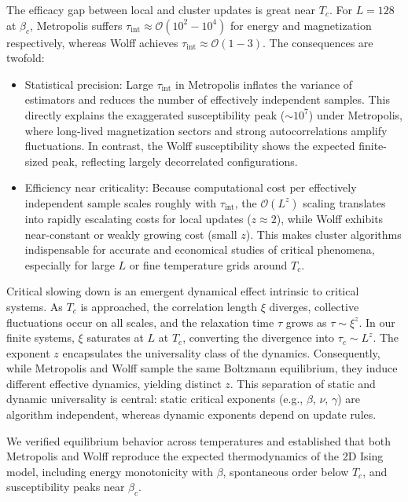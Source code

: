 The efficacy gap between local and cluster updates is great near $T_c$. For $L=128$ at $\beta_c$, Metropolis suffers $\tau_{\text{int}} \approx \mathcal{O}(10^{2}-10^{4})$ for energy and magnetization respectively, whereas Wolff achieves $\tau_{\text{int}} \approx \mathcal{O}(1-3)$. The consequences are twofold:
\begin{itemize}
	\item Statistical precision: Large $\tau_{\mathrm{int}}$ in Metropolis inflates the variance of estimators and reduces the number of effectively independent samples. This directly explains the exaggerated susceptibility peak ($\sim 10^{7}$) under Metropolis, where long-lived magnetization sectors and strong autocorrelations amplify fluctuations. In contrast, the Wolff susceptibility shows the expected finite-sized peak, reflecting largely decorrelated configurations.
	\item Efficiency near criticality: Because computational cost per effectively independent sample scales roughly with $\tau_{\mathrm{int}}$, the $\mathcal{O}(L^{z})$ scaling translates into rapidly escalating costs for local updates ($z \approx 2$), while Wolff exhibits near-constant or weakly growing cost (small $z$). This makes cluster algorithms indispensable for accurate and economical studies of critical phenomena, especially for large $L$ or fine temperature grids around $T_c$.
\end{itemize}

Critical slowing down is an emergent dynamical effect intrinsic to critical systems. As $T_c$ is approached, the correlation length $\xi$ diverges, collective fluctuations occur on all scales, and the relaxation time $\tau$ grows as $\tau \sim \xi^{z}$. In our finite systems, $\xi$ saturates at $L$ at $T_c$, converting the divergence into $\tau_c \sim L^{z}$. The exponent $z$ encapsulates the universality class of the dynamics. Consequently, while Metropolis and Wolff sample the same Boltzmann equilibrium, they induce different effective dynamics, yielding distinct $z$. This separation of static and dynamic universality is central: static critical exponents (e.g., $\beta$, $\nu$, $\gamma$) are algorithm independent, whereas dynamic exponents depend on update rules.

We verified equilibrium behavior across temperatures and established that both Metropolis and Wolff reproduce the expected thermodynamics of the 2D Ising model, including energy monotonicity with $\beta$, spontaneous order below $T_c$, and susceptibility peaks near $\beta_c$.

